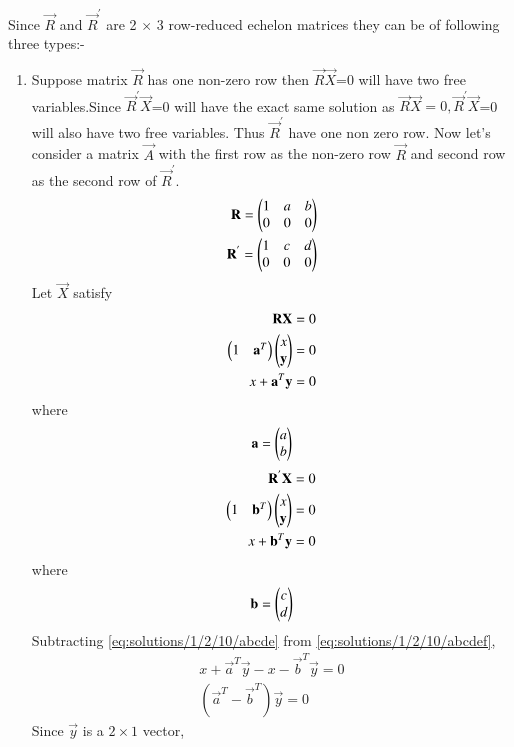 
 Since $\vec{R}$ and $\vec{R}^{'}$ are 2 $\times$ 3 row-reduced echelon matrices they can be of following three types:-
\begin{enumerate}
\item Suppose matrix $\vec{R}$ has one non-zero row then $\vec{R}\vec{X}$=0 will have two 
free variables.Since $\vec{R}^{'}\vec{X}$=0 will have the exact same solution as 
$\vec{R}\vec{X}=0, \vec{R}^{'} \vec{X}$=0 
will also have two free variables. Thus 
$\vec{R}^{'}$ have one non zero row.
Now let's consider a matrix $\vec{A}$ with the first 
row as the non-zero row $\vec{R}$ and second row as the second row of 
$\vec{R}^{'}$.
\begin{align}
\mathbf{R}=\begin{pmatrix}1&a&b\\0&0&0\end{pmatrix}\\
\mathbf{R}^{'}=\begin{pmatrix}1&c&d\\0&0&0\end{pmatrix}\\
  \end{align}
  Let $\vec{X}$ satisfy
  \begin{align}
  \mathbf{R}\mathbf{X}=0\label{eq:solutions/1/2/10/b}\\
  \begin{pmatrix}1 & \mathbf{a}^T\end{pmatrix}\begin{pmatrix}x \\ \mathbf{y}\end{pmatrix} = 0\\
  x+\mathbf{a}^T\mathbf{y}=0\label{eq:solutions/1/2/10/abcdef}
  \end{align}
  where 
  \begin{align}
  \mathbf{a}=\begin{pmatrix}a \\ b\end{pmatrix}
  \end{align}
  \begin{align}
  \mathbf{R}^{'}\mathbf{X}=0\label{eq:solutions/1/2/10/c}\\
   \begin{pmatrix}1 & \mathbf{b}^T\end{pmatrix}\begin{pmatrix}x \\ \mathbf{y}\end{pmatrix} = 0\\
   x+\mathbf{b}^T\mathbf{y}=0\label{eq:solutions/1/2/10/abcde}
  \end{align}
  where 
  \begin{align}
  \mathbf{b}=\begin{pmatrix}c \\ d\end{pmatrix}
  \end{align}
  Subtracting \eqref{eq:solutions/1/2/10/abcde} from \eqref{eq:solutions/1/2/10/abcdef},
  \begin{align}
  x+\vec{a}^T\vec{y}-x-\vec{b}^T\vec{y}=0\\
  (\vec{a}^T-\vec{b}^T)\vec{y}=0\label{eq:solutions/1/2/10/part1}
  \end{align}
  Since $\vec{y}$ is a $2 \times 1 $ vector,
  \begin{align}

\end{align}
\end{enumerate}
